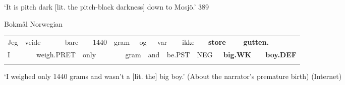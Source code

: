 \begin{styleTranslation}
‘It is pitch dark [lit. the pitch-black darkness] down to Mosjö.’ 389

\end{styleTranslation}

\begin{listWWNumileveli}
\item {}

\begin{styleExample}
Bokmål Norwegian

\end{styleExample}

\end{listWWNumileveli}

\begin{tabular}{llllllllllllllllllll}
\lsptoprule
Jeg & \multicolumn{2}{l}{veide

} & \multicolumn{2}{l}{bare

} & \multicolumn{2}{l}{1440

} & \multicolumn{2}{l}{gram

} & \multicolumn{2}{l}{og

} & \multicolumn{2}{l}{var

} & \multicolumn{2}{l}{ikke

} & \multicolumn{2}{l}{{\bfseries store}

} & \multicolumn{2}{l}{{\bfseries gutten.}

} & \\
\multicolumn{2}{l}{I

} & \multicolumn{2}{l}{weigh.PRET

} & \multicolumn{2}{l}{only

} & \multicolumn{2}{l}{} & \multicolumn{2}{l}{gram

} & \multicolumn{2}{l}{and

} & \multicolumn{2}{l}{be.PST

} & \multicolumn{2}{l}{NEG

} & \multicolumn{2}{l}{{\bfseries big.WK}

} & \multicolumn{2}{l}{{\bfseries boy.DEF}

}\\
\lspbottomrule
\end{tabular}

\begin{styleTranslation}
‘I weighed only 1440 grams and wasn’t a [lit. the] big boy.’ (About the narrator’s premature birth) (Internet) 

\end{styleTranslation}

